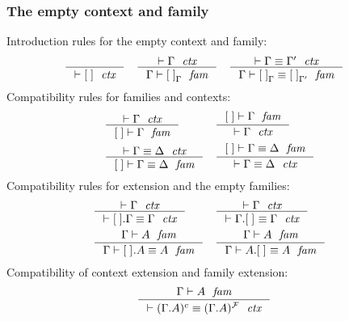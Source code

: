 \documentclass[handout]{beamer}
\begin{document}
\begin{frame}
\frametitle{The empty context and family}
\begin{small}
Introduction rules for the empty context and family:
\begin{align*}
& \inference
  { }
  { \jctx{\emptyc}
    }
& & \inference
  { \jctx{\Gamma}
    }
  { \jfam{\Gamma}{\emptyf[\Gamma]}
    }
& & \inference
  { \jctxeq{\Gamma}{\Gamma'}
    }
  { \jfameq{\Gamma}{\emptyf[\Gamma]}{\emptyf[\Gamma']}
    }
\end{align*}
\pause
Compatibility rules for families and contexts:
\begin{align*}
& \inference
  { \jctx{\Gamma}
    }
  { \jfam{\emptyc}{\Gamma}
    } 
& & \inference
    { \jfam{\emptyc}{\Gamma}
      }
    { \jctx{\Gamma}
      }
    \\
& \inference
  { \jctxeq{\Gamma}{\Delta}
    }
  { \jfameq{\emptyc}{\Gamma}{\Delta}
    }
& & \inference
    { \jfameq{\emptyc}{\Gamma}{\Delta}
      }
    { \jctxeq{\Gamma}{\Delta}
      }
\end{align*}
\pause
Compatibility rules for extension and the empty families:
\begin{align*}
& \inference
  { \jctx{\Gamma}
    }
  { \jctxeq{\ctxext{\emptyc}{\Gamma}}{\Gamma}
    }
& & \inference
  { \jctx{\Gamma}
    }
  { \jctxeq{\ctxext{\Gamma}{\emptyf}}{\Gamma}
    }
  \\
& \inference
  { \jfam{\Gamma}{A}
    }
  { \jfameq{\Gamma}{\ctxext{\emptyf}{A}}{A}
    }
& & \inference
  { \jfam{\Gamma}{A}
    }
  { \jfameq{\Gamma}{{A}{\emptyf}}{A}
    }
\end{align*}
Compatibility of context extension and family extension:
\begin{align*}
& \inference
  { \jfam{\Gamma}{A}
    }
  { \jctxeq{(\ctxext{\Gamma}{A})^c}{(\ctxext{\Gamma}{A})^\famsym}
    }
\end{align*}
\end{small}
\end{frame}
\end{document}
